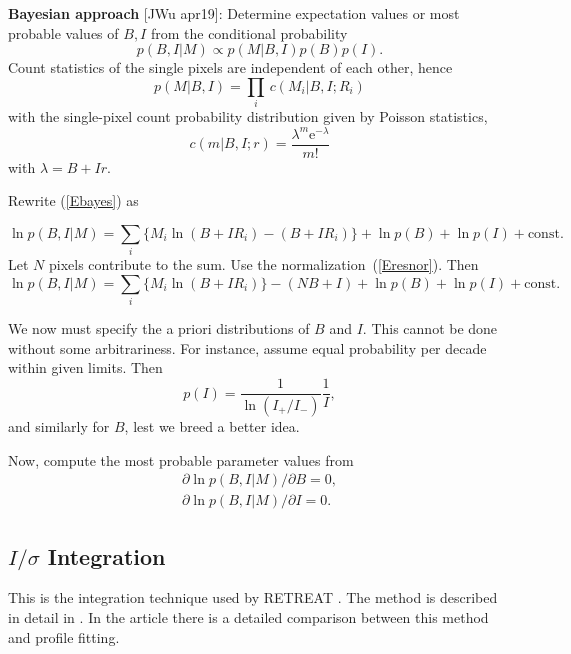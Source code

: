 \documentclass[twocolumn,preprintnumbers,amsmath,amssymb]{revtex4}
\begin{document}
\textbf{Bayesian approach} [JWu apr19]:
Determine expectation values or most probable values of $B,I$ from the conditional probability
\begin{equation}\label{Ebayes}
  p(B,I|M) \propto p(M|B,I) p(B) p(I).
\end{equation}
Count statistics of the single pixels are independent of each other, hence
\begin{equation}\label{Ec2p}
  p(M|B,I) = \prod_i\, c(M_i|B,I;R_i)
\end{equation}
with the single-pixel count probability distribution given by Poisson statistics,
\begin{equation}
  c(m|B,I;r) = \frac{\lambda^m{\mathrm e}^{-\lambda}}{m!}
\end{equation}
with $\lambda=B+Ir$.

Rewrite (\ref{Ebayes}) as
\begin{widetext}
\begin{equation}
  \ln p(B,I|M) = \sum_i\Big\{M_i\ln(B+IR_i)-(B+IR_i)\Big\} +\ln p(B) + \ln p(I) + \mathrm{const}.
\end{equation}
Let $N$ pixels contribute to the sum.
Use the normalization~(\ref{Eresnor}).
Then
\begin{equation}
  \ln p(B,I|M) = \sum_i\Big\{M_i\ln(B+IR_i)\Big\}-(NB+I) +\ln p(B) + \ln p(I) + \mathrm{const}.
\end{equation}
\end{widetext}
We now must specify the a priori distributions of $B$ and $I$.
This cannot be done without some arbitrariness.
For instance, assume equal probability per decade within given limits.
Then
\begin{equation}
  p(I) = \frac{1}{\ln(I_{+}/I_{-})} \frac{1}{I},
\end{equation}
and similarly for $B$, lest we breed a better idea.

Now, compute the most probable parameter values from
\begin{equation}
  \begin{array}{l}
  \partial \ln p(B,I|M) / \partial B = 0, \\[1.2ex]
  \partial \ln p(B,I|M) / \partial I = 0.
  \end{array}
\end{equation}

\subsection{$I/\sigma$ Integration}
This is the integration technique used by RETREAT \cite{retreat-manual}. The method is described in detail in \cite{wilkinson-1988}.
In the article \cite{prince-1997} there is a detailed comparison between this method and profile fitting.
\end{document}

